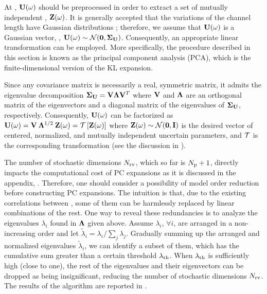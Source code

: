 At , $\mathbf{U}(\omega)$ should be preprocessed in order to extract a set of mutually independent \rvs, $\mathbf{Z}(\omega)$. It is generally accepted that the variations of the channel length have Gaussian distributions \cite{juan2011, juan2012, srivastava2010}; therefore, we assume that $\mathbf{U}(\omega)$ is a Gaussian vector, \ie, $\vU(\o) \sim \normal(\vZero, \mCov_\vU)$. Consequently, an appropriate linear transformation can be employed. More specifically, the procedure described in this section is known as the principal component analysis (PCA), which is the finite-dimensional version of the KL expansion.

Since any covariance matrix is necessarily a real, symmetric matrix, it admits the eigenvalue decomposition \cite{press2007} $\mCov_\vU = \m{V} \m{\Lambda} \m{V}^T$ where $\m{V}$ and $\m{\Lambda}$ are an orthogonal matrix of the eigenvectors and a diagonal matrix of the eigenvalues of $\mCov_\vU$, respectively. Consequently, $\mathbf{U}(\omega)$ can be factorized as $\vU(\o) = \m{V} \: \m{\Lambda}^{1/2} \: \vZ(\o) = \oTransform{\vZ(\o)}$ where $\vZ(\o) \sim \normal(\vZero, \mI)$ is the desired vector of centered, normalized, and mutually independent uncertain parameters, and $\oTransform$ is the corresponding transformation (see the discussion in ).

The number of stochastic dimensions ${N_\text{rv}}$, which so far is ${N_\text{p}} + 1$, directly impacts the computational cost of PC expansions as it is discussed in the appendix, . Therefore, one should consider a possibility of model order reduction before constructing PC expansions. The intuition is that, due to the existing correlations between \rvs, some of them can be harmlessly replaced by linear combinations of the rest. One way to reveal these redundancies is to analyze the eigenvalues $\lambda_i$ found in $\m{\Lambda}$ given above. Assume $\lambda_i$, $\forall i$, are arranged in a non-increasing order and let $\tilde{\lambda}_i = \lambda_i / \sum_j \lambda_j$. Gradually summing up the arranged and normalized eigenvalues $\tilde{\lambda}_i$, we can identify a subset of them, which has the cumulative sum greater than a certain threshold $\lambda_\text{th}$. When $\lambda_\text{th}$ is sufficiently high (close to one), the rest of the eigenvalues and their eigenvectors can be dropped as being insignificant, reducing the number of stochastic dimensions ${N_\text{rv}}$. The results of the algorithm are reported in .
